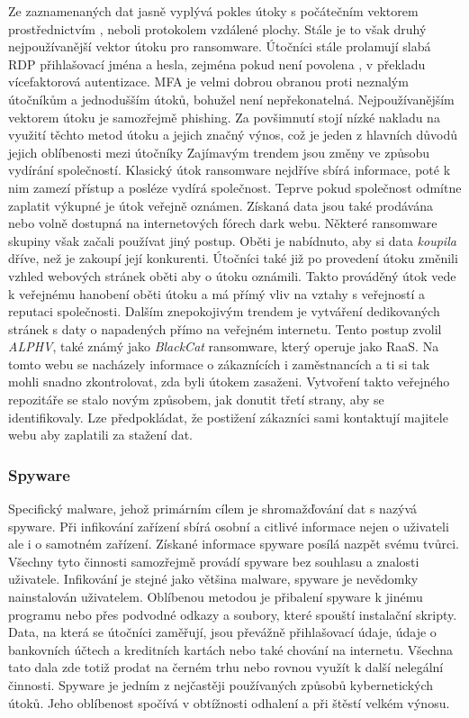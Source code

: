 Ze zaznamenaných dat jasně vyplývá pokles útoky s počátečním vektorem prostřednictvím , neboli protokolem vzdálené plochy.
Stále je to však druhý nejpoužívanější vektor útoku pro ransomware.
Útočníci stále prolamují slabá \ac{RDP} přihlašovací jména a hesla, zejména pokud není povolena , v překladu vícefaktorová autentizace.
\ac{MFA} je velmi dobrou obranou proti neznalým útočníkům a jednodušším útoků, bohužel není nepřekonatelná.
Nejpoužívanějším vektorem útoku je samozřejmě phishing.
Za povšimnutí stojí nízké nakladu na využití těchto metod útoku a jejich značný výnos, což je jeden z hlavních důvodů jejich oblíbenosti mezi útočníky
Zajímavým trendem jsou změny ve způsobu vydírání společností.
Klasický útok ransomware nejdříve sbírá informace, poté k nim zamezí přístup a posléze vydírá společnost.
Teprve pokud společnost odmítne zaplatit výkupné je útok veřejně oznámen.
Získaná data jsou také prodávána nebo volně dostupná na internetových fórech dark webu.
Některé ransomware skupiny však začali používat jiný postup.
Oběti je nabídnuto, aby si data \textit{koupila} dříve, než je zakoupí její konkurenti.
Útočníci také již po provedení útoku změnili vzhled webových stránek oběti aby o útoku oznámili.
Takto prováděný útok vede k veřejnému hanobení oběti útoku a má přímý vliv na vztahy s veřejností a reputaci společnosti.
Dalším znepokojivým trendem je vytváření dedikovaných stránek s daty o napadených přímo na veřejném internetu.
Tento postup zvolil \textit{ALPHV}, také známý jako \textit{BlackCat} ransomware, který operuje jako \ac{RaaS}\cite{ALPHV_blackcat}.
Na tomto webu se nacházely informace o zákaznících i zaměstnancích a ti si tak mohli snadno zkontrolovat, zda byli útokem zasaženi.
Vytvoření takto veřejného repozitáře se stalo novým způsobem, jak donutit třetí strany, aby se identifikovaly.
Lze předpokládat, že postižení zákazníci sami kontaktují majitele webu aby zaplatili za stažení dat.

\subsubsection{Spyware}
Specifický malware, jehož primárním cílem je shromažďování dat s nazývá spyware.
Při infikování zařízení sbírá osobní a citlivé informace nejen o uživateli ale i o samotném zařízení.
Získané informace spyware posílá nazpět svému tvůrci.
Všechny tyto činnosti samozřejmě provádí spyware bez souhlasu a znalosti uživatele.
Infikování je stejné jako většina malware, spyware je nevědomky nainstalován uživatelem.
Oblíbenou metodou je přibalení spyware k jinému programu nebo přes podvodné odkazy a soubory, které spouští instalační skripty.
Data, na která se útočníci zaměřují, jsou převážně přihlašovací údaje, údaje o bankovních účtech a kreditních kartách nebo také chování na internetu.
Všechna tato dala zde totiž prodat na černém trhu nebo rovnou využít k další nelegální činnosti.
Spyware je jedním z nejčastěji používaných způsobů kybernetických útoků.
Jeho oblíbenost spočívá v obtížnosti odhalení a při štěstí velkém výnosu.\cite{avast_spyware, fortinet_spyware}


